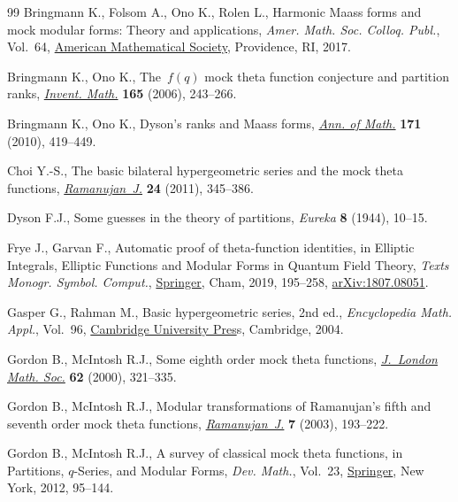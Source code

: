 \documentclass[pdftex]{sigma}
\numberwithin{equation}{section}
\begin{document}
\begin{thebibliography}{99}
Bringmann K., Folsom A., Ono K., Rolen L., Harmonic {M}aass forms and mock
  modular forms: {T}heory and applications, \textit{Amer. Math. Soc. Colloq.
  Publ.}, Vol.~64, \href{https://doi.org/10.1090/coll/064}{American
  Mathematical Society}, Providence, RI, 2017.

Bringmann K., Ono K., The~{$f(q)$} mock theta function conjecture and partition
  ranks, \href{https://doi.org/10.1007/s00222-005-0493-5}{\textit{Invent.
  Math.}} \textbf{165} (2006), 243--266.

Bringmann K., Ono K., Dyson's ranks and {M}aass forms,
  \href{https://doi.org/10.4007/annals.2010.171.419}{\textit{Ann. of Math.}}
  \textbf{171} (2010), 419--449.

Choi Y.-S., The basic bilateral hypergeometric series and the mock theta
  functions,
  \href{https://doi.org/10.1007/s11139-010-9269-7}{\textit{Ramanujan~J.}}
  \textbf{24} (2011), 345--386.

Dyson F.J., Some guesses in the theory of partitions, \textit{Eureka}
  \textbf{8} (1944), 10--15.

Frye J., Garvan F., Automatic proof of theta-function identities, in Elliptic
  {I}ntegrals, {E}lliptic {F}unctions and {M}odular {F}orms in {Q}uantum
  {F}ield {T}heory, \textit{Texts Monogr. Symbol. Comput.},
  \href{https://doi.org/10.1007/978-3-030-04480-0_10}{Springer}, Cham, 2019,
  195--258, \href{http://arxiv.org/abs/1807.08051}{arXiv:1807.08051}.

Gasper G., Rahman M., Basic hypergeometric series, 2nd ed., \textit{Encyclopedia Math.
  Appl.}, Vol.~96,
  \href{https://doi.org/10.1017/CBO9780511526251}{Cambridge University Pres}s,
  Cambridge, 2004.

Gordon B., McIntosh R.J., Some eighth order mock theta functions,
  \href{https://doi.org/10.1112/S0024610700008735}{\textit{J.~London Math.
  Soc.}} \textbf{62} (2000), 321--335.

Gordon B., McIntosh R.J., Modular transformations of {R}amanujan's fifth and
  seventh order mock theta functions, \href{https://doi.org/10.1023/A:1026299229509}{\textit{Ramanujan~J.}} \textbf{7} (2003), 193--222.

Gordon B., McIntosh R.J., A survey of classical mock theta functions, in
  Partitions, {$q$}-{S}eries, and {M}odular {F}orms, \textit{Dev. Math.},
  Vol.~23, \href{https://doi.org/10.1007/978-1-4614-0028-8_9}{Springer}, New
  York, 2012, 95--144.


\end{thebibliography}
\end{document}
